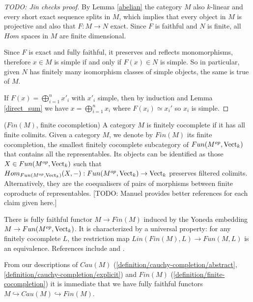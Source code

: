 \begin{proof}
  [TODO: Jin checks proof]

  By Lemma \ref{abelian} the category $M$ also $k$-linear and every short exact sequence splits in $M$, which implies that every object in $M$ is projective and also that $F:M\to N$ exact. Since $F$ is faithful and $N$ is finite, all $Hom$ spaces in $M$ are finite dimensional.

  Since $F$ is exact and fully faithful, it preserves and reflects
  monomorphisms, therefore $x\in M$ is simple if and only if $F(x)\in N$ is
  simple. So in particular, given $N$ has finitely many isomorphism classes of
  simple objects, the same is true of $M$.

  If $F(x)=\bigoplus_{i=1}^n x'_i$ with $x'_i$ simple, then by induction and
  Lemma \ref{direct_sum} we have $x=\bigoplus_{i=1}^n x_i$ where
  $F(x_i)\simeq x_i'$ so $x_i$ is simple.
\end{proof}

\begin{definition} \label{definition/finite-cocompletion} ($Fin(M)$, finite cocompletion)
  A category $M$ is finitely cocomplete if it has all finite colimits. Given a
  category $M$, we denote by $Fin(M)$ its finite cocompletion, the
  smallest finitely cocomplete subcategory of $Fun(M^{op},\operatorname{Vect}_k)$ that
  contains all the representables. Its objects can be identified as those
  $X\in Fun(M^{op},\operatorname{Vect}_k)$ such that
  $Hom_{Fun(M^{op},\operatorname{Vect}_k)}(X,-):Fun(M^{op},\operatorname{Vect}_k)\to \operatorname{Vect}_k$ preserves filtered
  colimits. Alternatively, they are the coequalisers of pairs of morphisms
  between finite coproducts of representables. [TODO: Manuel provides better references for each claim given here.]

  There is fully
  faithful functor $M\to Fin(M)$ induced by the Yoneda embedding $M \to Fun(M^{op}, \operatorname{Vect}_{k})$. It is characterized by a universal
  property: for any finitely cocomplete $L$, the restriction map
  $Lin(Fin(M),L)\to Fun(M,L)$ is an equivalence. References include
  \cite[Section 5.7]{kelly/basic-concepts-enriched} and \cite[Section
  2.2.1]{lopezfranco/tensor-products}.
\end{definition}

\begin{remark}
  From our descriptions of $Cau(M)$
  (\ref{definition/cauchy-completion/abstract},
  \ref{definition/cauchy-completion/explicit}) and $Fin(M)$
  (\ref{definition/finite-cocompletion}) it is immediate that we have fully
  faithful functors $M\hookrightarrow Cau(M)\hookrightarrow Fin(M)$.
\end{remark}

